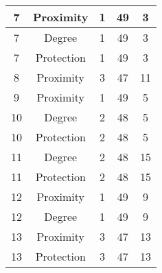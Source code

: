 \documentclass[results.tex]{subfiles}
\begin{document}
\begin{center}
\begin{tabular}{| c || c | c | c | c |}
            \hline
            7                       & Proximity                    & 1                      & 49                      & 3                    \\
            \hline
            7                       & Degree                       & 1                      & 49                      & 3                    \\
            \hline
            7                       & Protection                   & 1                      & 49                      & 3                    \\
            \hline
            8                       & Proximity                    & 3                      & 47                      & 11                   \\
            \hline
            9                       & Proximity                    & 1                      & 49                      & 5                    \\
            \hline
            10                      & Degree                       & 2                      & 48                      & 5                    \\
            \hline
            10                      & Protection                   & 2                      & 48                      & 5                    \\
            \hline
            11                      & Degree                       & 2                      & 48                      & 15                   \\
            \hline
            11                      & Protection                   & 2                      & 48                      & 15                   \\
            \hline
            12                      & Proximity                    & 1                      & 49                      & 9                    \\
            \hline
            12                      & Degree                       & 1                      & 49                      & 9                    \\
            \hline
            13                      & Proximity                    & 3                      & 47                      & 13                   \\
            \hline
            13                      & Protection                   & 3                      & 47                      & 13                   \\

\end{tabular}
\end{center}
\end{document}
